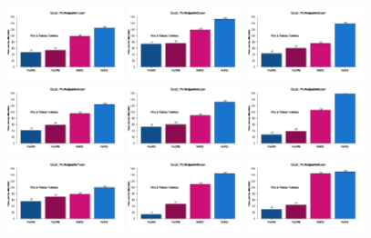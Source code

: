 \begin{figure}[th]
\centering
\includegraphics[width=0.30\textwidth]{Figures/MirrorRate_Exp2_P1} \includegraphics[width=0.30\textwidth]{Figures/MirrorRate_Exp2_P2} \includegraphics[width=0.30\textwidth]{Figures/MirrorRate_Exp2_P3}
\includegraphics[width=0.30\textwidth]{Figures/MirrorRate_Exp2_P4} \includegraphics[width=0.30\textwidth]{Figures/MirrorRate_Exp2_P5} \includegraphics[width=0.30\textwidth]{Figures/MirrorRate_Exp2_P6}
\includegraphics[width=0.30\textwidth]{Figures/MirrorRate_Exp2_P7} \includegraphics[width=0.30\textwidth]{Figures/MirrorRate_Exp2_P8} \includegraphics[width=0.30\textwidth]{Figures/MirrorRate_Exp2_P9}

\end{figure}

